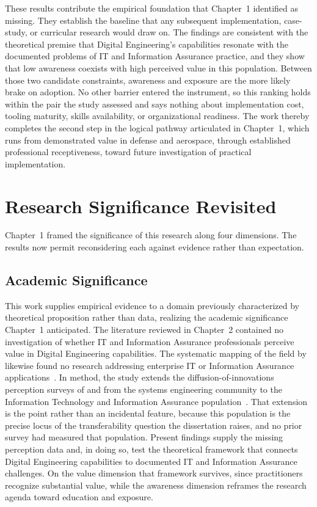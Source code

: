 These results contribute the empirical foundation that Chapter~1 identified as missing. They establish the baseline that any subsequent implementation, case-study, or curricular research would draw on. The findings are consistent with the theoretical premise that Digital Engineering's capabilities resonate with the documented problems of IT and Information Assurance practice, and they show that low awareness coexists with high perceived value in this population. Between those two candidate constraints, awareness and exposure are the more likely brake on adoption. No other barrier entered the instrument, so this ranking holds within the pair the study assessed and says nothing about implementation cost, tooling maturity, skills availability, or organizational readiness. The work thereby completes the second step in the logical pathway articulated in Chapter~1, which runs from demonstrated value in defense and aerospace, through established professional receptiveness, toward future investigation of practical implementation.

\section{Research Significance Revisited}

Chapter~1 framed the significance of this research along four dimensions. The results now permit reconsidering each against evidence rather than expectation.

\subsection{Academic Significance}

This work supplies empirical evidence to a domain previously characterized by theoretical proposition rather than data, realizing the academic significance Chapter~1 anticipated. The literature reviewed in Chapter~2 contained no investigation of whether IT and Information Assurance professionals perceive value in Digital Engineering capabilities. The systematic mapping of the field by \citeauthor{Wooley_Womack_2025} likewise found no research addressing enterprise IT or Information Assurance applications~\parencite{Wooley_Womack_2025}. In method, the study extends the diffusion-of-innovations perception surveys of \citeauthor{Call_2024} and \citeauthor{Henderson_McDermott_Salado_2024} from the systems engineering community to the Information Technology and Information Assurance population~\parencite{Call_2024, Henderson_McDermott_Salado_2024}. That extension is the point rather than an incidental feature, because this population is the precise locus of the transferability question the dissertation raises, and no prior survey had measured that population. Present findings supply the missing perception data and, in doing so, test the theoretical framework that connects Digital Engineering capabilities to documented IT and Information Assurance challenges. On the value dimension that framework survives, since practitioners recognize substantial value, while the awareness dimension reframes the research agenda toward education and exposure.

